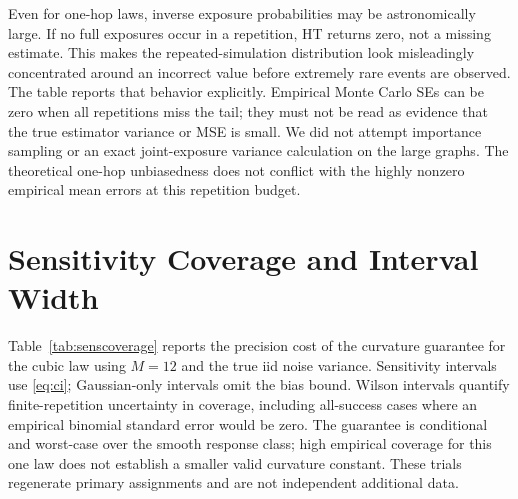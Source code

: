 \documentclass{article}
\begin{document}
Even for one-hop laws, inverse exposure probabilities may be astronomically large. If no full exposures occur in a repetition, HT returns zero, not a missing estimate. This makes the repeated-simulation distribution look misleadingly concentrated around an incorrect value before extremely rare events are observed. The table reports that behavior explicitly. Empirical Monte Carlo SEs can be zero when all repetitions miss the tail; they must not be read as evidence that the true estimator variance or MSE is small. We did not attempt importance sampling or an exact joint-exposure variance calculation on the large graphs. The theoretical one-hop unbiasedness does not conflict with the highly nonzero empirical mean errors at this repetition budget.
\begin{table}[h]\centering\small
\caption{One-hop cubic-response HT: observed finite-budget behavior, not a resolved estimate of its rare-tail risk. RMSE MCSE is the empirical delta-method value and can severely understate uncertainty.}

\end{table}

\section{Sensitivity Coverage and Interval Width}
Table~\ref{tab:senscoverage} reports the precision cost of the curvature guarantee for the cubic law using $M=12$ and the true iid noise variance. Sensitivity intervals use \eqref{eq:ci}; Gaussian-only intervals omit the bias bound. Wilson intervals quantify finite-repetition uncertainty in coverage, including all-success cases where an empirical binomial standard error would be zero. The guarantee is conditional and worst-case over the smooth response class; high empirical coverage for this one law does not establish a smaller valid curvature constant. These trials regenerate primary assignments and are not independent additional data.
\begin{table}[h]\centering\scriptsize
\caption{OLS-L, cubic law, 400 repetitions per graph/design: coverage and average sensitivity half-width (in GATE units). Coverage uncertainty is a 95\% Wilson interval; width uncertainty is one Monte Carlo SE. Covariance and $M$ are supplied, not estimated.}\label{tab:senscoverage}

\end{table}

\clearpage
\end{document}
